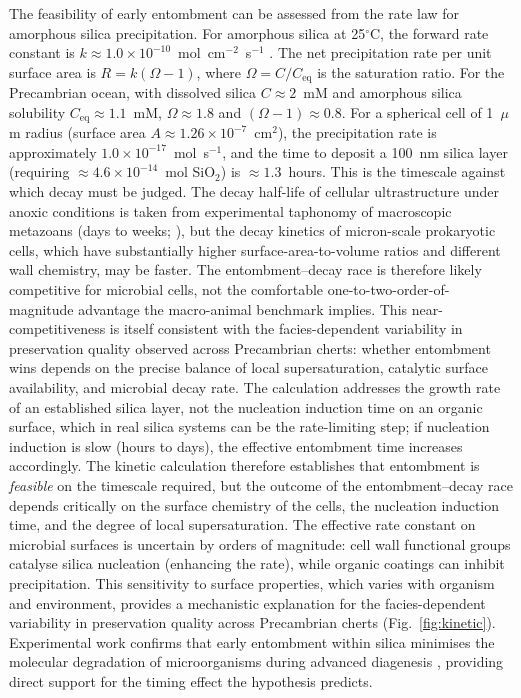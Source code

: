 \documentclass[11pt]{article}
\begin{document}
The feasibility of early entombment can be assessed from the rate law for amorphous silica
precipitation. For amorphous silica at 25$^\circ$C, the forward rate constant is
$k \approx 1.0 \times 10^{-10}$~mol~cm$^{-2}$~s$^{-1}$ \citep{Rimstidt1980}. The net precipitation
rate per unit surface area is $R = k(\Omega - 1)$, where $\Omega = C/C_{\mathrm{eq}}$ is the
saturation ratio. For the Precambrian ocean, with dissolved silica $C \approx 2$~mM
\citep{Siever1992} and amorphous silica solubility $C_{\mathrm{eq}} \approx 1.1$~mM,
$\Omega \approx 1.8$ and $(\Omega - 1) \approx 0.8$. For a spherical cell of 1~$\mu$m radius (surface
area $A \approx 1.26 \times 10^{-7}$~cm$^2$), the precipitation rate is approximately
$1.0 \times 10^{-17}$~mol~s$^{-1}$, and the time to deposit a 100~nm silica layer (requiring
$\approx 4.6 \times 10^{-14}$~mol SiO$_2$) is $\approx 1.3$~hours. This is the timescale against
which decay must be judged. The decay half-life of cellular ultrastructure under anoxic conditions is
taken from experimental taphonomy of macroscopic metazoans (days to weeks; \citealp{TaxonRedox2025}),
but the decay kinetics of micron-scale prokaryotic cells, which have substantially higher
surface-area-to-volume ratios and different wall chemistry, may be faster. The entombment--decay race
is therefore likely competitive for microbial cells, not the comfortable one-to-two-order-of-magnitude
advantage the macro-animal benchmark implies. This near-competitiveness is itself consistent with the
facies-dependent variability in preservation quality observed across Precambrian cherts: whether
entombment wins depends on the precise balance of local supersaturation, catalytic surface
availability, and microbial decay rate. The calculation addresses the growth rate of an established
silica layer, not the nucleation induction time on an organic surface, which in real silica systems
can be the rate-limiting step; if nucleation induction is slow (hours to days), the effective
entombment time increases accordingly. The kinetic calculation therefore establishes that entombment
is \emph{feasible} on the timescale required, but the outcome of the entombment--decay race depends
critically on the surface chemistry of the cells, the nucleation induction time, and the degree of
local supersaturation. The
effective rate constant on microbial surfaces is uncertain by orders of magnitude: cell wall
functional groups catalyse silica nucleation (enhancing the rate), while organic coatings can inhibit
precipitation. This sensitivity to surface properties, which varies with organism and environment,
provides a mechanistic explanation for the facies-dependent variability in preservation quality
across Precambrian cherts (Fig.~\ref{fig:kinetic}). Experimental work confirms that early entombment
within silica minimises the molecular degradation of microorganisms during advanced diagenesis
\citep{Alleon2016b}, providing direct support for the timing effect the hypothesis predicts.
\end{document}
